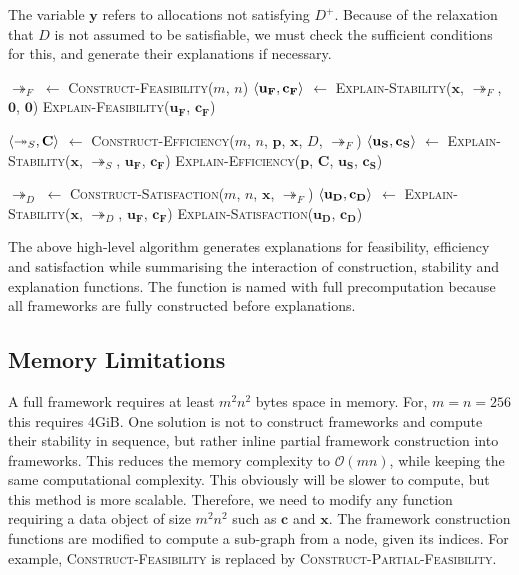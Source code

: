 The variable $\mathbf{y}$ refers to allocations not satisfying $D^+$. Because of the relaxation that $D$ is not assumed to be satisfiable, we must check the sufficient conditions for this, and generate their explanations if necessary.

\begin{algorithm}[H]
	\caption{}
	\begin{algorithmic}[1]
			\State $\twoheadrightarrow_F$ $\gets$ \textsc{Construct-Feasibility}($m$, $n$)
			\State $\langle{\mathbf{u_F}},{\mathbf{c_F}}\rangle$ $\gets$ \textsc{Explain-Stability}($\mathbf{x}$, $\twoheadrightarrow_F$, $\mathbf{0}$, $\mathbf{0}$)
			\State\textsc{Explain-Feasibility}($\mathbf{u_F}$, $\mathbf{c_F}$)

			\State $\langle{\twoheadrightarrow_S},{\mathbf{C}}\rangle$ $\gets$ \textsc{Construct-Efficiency}($m$, $n$, $\mathbf{p}$, $\mathbf{x}$, $D$, $\twoheadrightarrow_F$)
			\State $\langle{\mathbf{u_S}},{\mathbf{c_S}}\rangle$ $\gets$ \textsc{Explain-Stability}($\mathbf{x}$, $\twoheadrightarrow_S$, $\mathbf{u_F}$, $\mathbf{c_F}$)
			\State\textsc{Explain-Efficiency}($\mathbf{p}$, $\mathbf{C}$, $\mathbf{u_S}$, $\mathbf{c_S}$)

			\State $\twoheadrightarrow_D$ $\gets$ \textsc{Construct-Satisfaction}($m$, $n$, $\mathbf{x}$, $\twoheadrightarrow_F$)
			\State $\langle{\mathbf{u_D}},{\mathbf{c_D}}\rangle$ $\gets$ \textsc{Explain-Stability}($\mathbf{x}$, $\twoheadrightarrow_D$, $\mathbf{u_F}$, $\mathbf{c_F}$)
			\State\textsc{Explain-Satisfaction}($\mathbf{u_D}$, $\mathbf{c_D}$)
		\EndFunction
	\end{algorithmic}
\end{algorithm}

The above high-level algorithm generates explanations for feasibility, efficiency and satisfaction while summarising the interaction of construction, stability and explanation functions. The function is named with full precomputation because all frameworks are fully constructed before explanations.

\subsection{Memory Limitations}

A full framework requires at least $m^2n^2$ bytes space in memory. For, $m=n=256$ this requires 4GiB. One solution is not to construct frameworks and compute their stability in sequence, but rather inline partial framework construction into frameworks. This reduces the memory complexity to $\mathcal{O}(mn)$, while keeping the same computational complexity. This obviously will be slower to compute, but this method is more scalable. Therefore, we need to modify any function requiring a data object of size $m^2n^2$ such as $\mathbf{c}$ and $\mathbf{x}$.
\linespace
The framework construction functions are modified to compute a sub-graph from a node, given its indices. For example, \textsc{Construct-Feasibility} is replaced by \textsc{Construct-Partial-Feasibility}.

